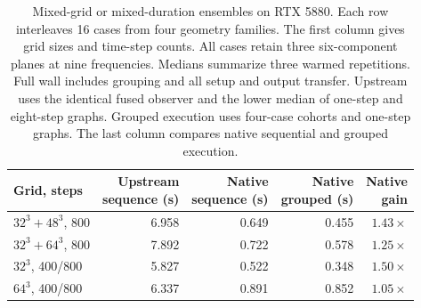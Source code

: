 \begin{table}[tbp]
\centering
\small
\renewcommand{\arraystretch}{1.15}
\caption{Mixed-grid or mixed-duration ensembles on RTX 5880. Each row interleaves 16 cases from four geometry families. The first column gives grid sizes and time-step counts. All cases retain three six-component planes at nine frequencies. Medians summarize three warmed repetitions. Full wall includes grouping and all setup and output transfer. Upstream uses the identical fused observer and the lower median of one-step and eight-step graphs. Grouped execution uses four-case cohorts and one-step graphs. The last column compares native sequential and grouped execution.}
\label{tab:grouped-ensembles}
\begin{tabular}{@{}lrrrr@{}}
\toprule
Grid, steps & \shortstack{Upstream\\sequence (s)} & \shortstack{Native\\sequence (s)} & \shortstack{Native\\grouped (s)} & \shortstack{Native\\gain} \\
\midrule
$32^3+48^3$, 800 & 6.958 & 0.649 & 0.455 & $1.43\times$ \\
$32^3+64^3$, 800 & 7.892 & 0.722 & 0.578 & $1.25\times$ \\
$32^3$, 400/800 & 5.827 & 0.522 & 0.348 & $1.50\times$ \\
$64^3$, 400/800 & 6.337 & 0.891 & 0.852 & $1.05\times$ \\
\bottomrule
\end{tabular}
\end{table}
